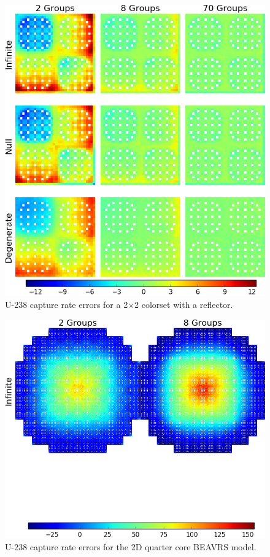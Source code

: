 \begin{figure}[h!]
\centering
\includegraphics[width=\linewidth]{figures/quantification/reflector/capt-err}
\caption[U-238 capture rate errors for a 2$\times$2 colorset with a reflector]{U-238 capture rate errors for a 2$\times$2 colorset with a reflector.}
\label{fig:chap8-reflector-capt-err}
\end{figure}

\begin{figure}[h!]
\centering
\includegraphics[width=\linewidth]{figures/quantification/full-core/capt-err}
\caption[U-238 capture rate errors for the 2D quarter core \ac{BEAVRS} model]{U-238 capture rate errors for the 2D quarter core \ac{BEAVRS} model.}
\label{fig:chap8-full-core-capt-err}
\end{figure}

